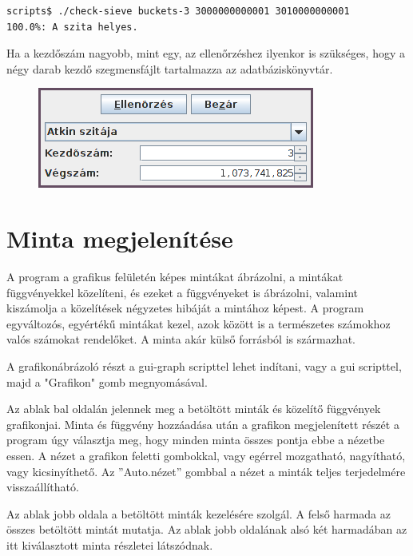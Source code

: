 \begin{lstlisting}[language=bash]
scripts$ ./check-sieve buckets-3 3000000000001 3010000000001
100.0%: A szita helyes.
\end{lstlisting}

Ha a kezdőszám nagyobb, mint egy, az ellenőrzéshez ilyenkor is szükséges,
hogy a négy darab kezdő szegmensfájlt tartalmazza az adatbáziskönyvtár.

\begin{figure}[h]
\centering
\includegraphics[scale=1]{check-sieve.png}
\end{figure}

\section{Minta megjelenítése}

A program a grafikus felületén képes mintákat ábrázolni, a mintákat függvényekkel
közelíteni, és ezeket a függvényeket is ábrázolni, valamint kiszámolja a közelítések
négyzetes hibáját a mintához képest.
A program egyváltozós, egyértékű mintákat kezel,
azok között is a természetes számokhoz valós számokat
rendelőket.
A minta akár külső forrásból is származhat.

A grafikonábrázoló részt a gui-graph scripttel lehet indítani,
vagy a gui scripttel, majd a "Grafikon" gomb megnyomásával.

Az ablak bal oldalán jelennek meg a betöltött minták és közelítő függvények
grafikonjai. Minta és függvény hozzáadása után a grafikon megjelenített részét
a program úgy választja meg, hogy minden minta összes pontja ebbe a nézetbe essen.
A nézet a grafikon feletti gombokkal, vagy egérrel mozgatható, nagyítható, vagy
kicsinyíthető.
Az ''Auto.nézet'' gombbal a nézet a minták teljes terjedelmére visszaállítható.

Az ablak jobb oldala a betöltött minták kezelésére szolgál.
A felső harmada az összes betöltött mintát mutatja.
Az ablak jobb oldalának alsó két harmadában az itt kiválasztott minta részletei
látszódnak.


